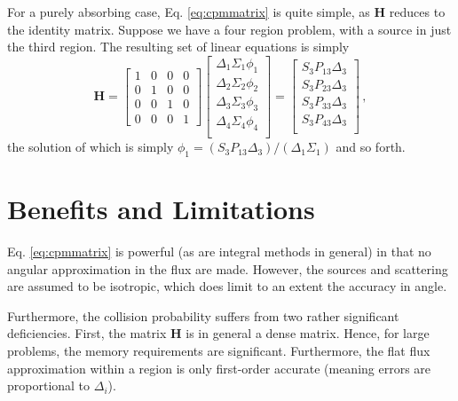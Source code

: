 For a purely absorbing case, Eq. \ref{eq:cpmmatrix} is quite simple, as $\mathbf{H}$ reduces to the identity matrix.  Suppose we have a four region problem, with a source in just the third region.  The resulting set of linear equations is simply
\begin{equation}
  \mathbf{H} = 	\left
	[\begin{array}{cccc}
        1 & 0 & 0 & 0 \\
        0 & 1 & 0 & 0 \\ 
        0 & 0 & 1 & 0 \\
        0 & 0 & 0 & 1
	\end{array} 
	\right ] 
	\left
	[\begin{array}{c}
	  \Delta_1 \Sigma_1 \phi_1    \\
	  \Delta_2 \Sigma_2 \phi_2    \\
	  \Delta_3 \Sigma_3 \phi_3    \\
	  \Delta_4 \Sigma_4 \phi_4    \\
	\end{array} 
	\right ] =
	\left
	[\begin{array}{c}
	  S_3 P_{13} \Delta_3       \\
	  S_3 P_{23} \Delta_3       \\
	  S_3 P_{33} \Delta_3       \\
	  S_3 P_{43} \Delta_3       \\
	\end{array} 
	\right ] \, ,
\end{equation}
the solution of which is simply $\phi_1 = (S_3 P_{13} \Delta_3)/(\Delta_1 \Sigma_1)$ and so forth.

\section*{Benefits and Limitations}

Eq. \ref{eq:cpmmatrix} is powerful (as are integral methods in general) in that no angular approximation in the flux are made.  However, the sources and scattering are assumed to be isotropic, which does limit to an extent the accuracy in angle.

Furthermore, the collision probability suffers from two rather significant deficiencies.  First, the matrix $\mathbf{H}$ is in general a dense matrix.  Hence, for large problems, the memory requirements are significant.  Furthermore, the flat flux approximation within a region is only first-order accurate (meaning errors are proportional to $\Delta_i$).

